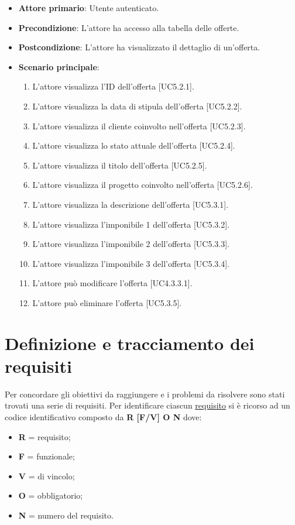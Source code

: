 \begin{itemize}
\item \textbf{Attore primario}: Utente autenticato.
\item \textbf{Precondizione}: L'attore ha accesso alla tabella delle offerte.
\item \textbf{Postcondizione}: L'attore ha visualizzato il dettaglio di un'offerta.

\pagebreak
\item \textbf{Scenario principale}: 
\begin{enumerate}
\item L'attore visualizza l'ID dell'offerta [UC5.2.1].
\item L'attore visualizza la data di stipula dell'offerta [UC5.2.2].
\item L'attore visualizza il cliente coinvolto nell'offerta [UC5.2.3].
\item L'attore visualizza lo stato attuale dell'offerta [UC5.2.4].
\item L'attore visualizza il titolo dell'offerta [UC5.2.5].
\item L'attore visualizza il progetto coinvolto nell'offerta [UC5.2.6].
\item L'attore visualizza la descrizione dell'offerta [UC5.3.1].
\item L'attore visualizza l'imponibile 1 dell'offerta [UC5.3.2].
\item L'attore visualizza l'imponibile 2 dell'offerta [UC5.3.3].
\item L'attore visualizza l'imponibile 3 dell'offerta [UC5.3.4].
\item L'attore può modificare l'offerta [UC4.3.3.1].
\item L'attore può eliminare l'offerta [UC5.3.5].
\end{enumerate}
\end{itemize}

\section{Definizione e tracciamento dei requisiti}
Per concordare gli obiettivi da raggiungere e i problemi da risolvere sono stati trovati una serie di requisiti. 
Per identificare ciascun {\hyperref[para:requisito-definition]{requisito}}\glsfirstoccur \; si è ricorso ad un codice identificativo composto da \textbf{R [F/V] O N} dove:
\begin{itemize}
\item \textbf{R} = requisito;
\item \textbf{F} = funzionale;
\item \textbf{V} = di vincolo;
\item \textbf{O} = obbligatorio;
\item \textbf{N} = numero del requisito.
\end{itemize}


